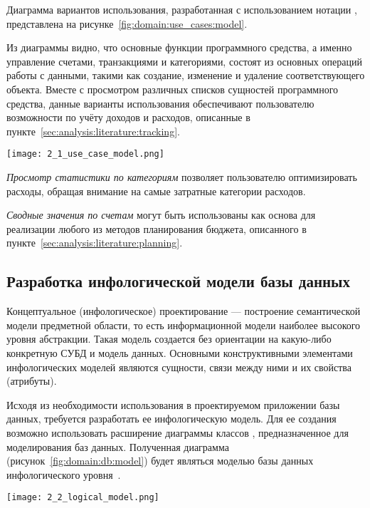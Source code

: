 Диаграмма вариантов использования, разработанная с использованием нотации \uml, представлена на рисунке~\ref{fig:domain:use_cases:model}.

Из диаграммы видно, что основные функции программного средства, а именно управление счетами, транзакциями и категориями, состоят из основных операций работы с данными, такими как создание, изменение и удаление соответствующего объекта.
Вместе с просмотром различных списков сущностей программного средства, данные варианты использования обеспечивают пользователю возможности по учёту доходов и расходов, описанные в пункте~\ref{sec:analysis:literature:tracking}.

\begin{sidewaysfigure}
    \centering
    \texttt{[image: 2\_1\_use\_case\_model.png]}
    \caption{Диаграмма вариантов использования ПС}
    \label{fig:domain:use_cases:model}
\end{sidewaysfigure}

\emph{Просмотр статистики по категориям} позволяет пользователю оптимизировать расходы, обращая внимание на самые затратные категории расходов.

\emph{Сводные значения по счетам} могут быть использованы как основа для реализации любого из методов планирования бюджета, описанного в пункте~\ref{sec:analysis:literature:planning}.

\subsection{Разработка инфологической модели базы данных}
\label{sec:domain:db}

Концептуальное (инфологическое) проектирование — построение семантической модели предметной области, то есть информационной модели наиболее высокого уровня абстракции.
Такая модель создается без ориентации на какую-либо конкретную СУБД и модель данных.
Основными конструктивными элементами инфологических моделей являются сущности, связи между ними и их свойства (атрибуты).

Исходя из необходимости использования в проектируемом приложении базы данных, требуется разработать ее инфологическую модель.
Для ее создания возможно использовать расширение диаграммы классов \uml, предназначенное для моделирования баз данных.
Полученная диаграмма (рисунок~\ref{fig:domain:db:model}) будет являться моделью базы данных инфологического уровня~\cite{kulikov_db_workbook}.

\begin{sidewaysfigure}
    \centering
    \texttt{[image: 2\_2\_logical\_model.png]}
    \caption{Инфологическая модель базы данных ПС}
    \label{fig:domain:db:model}
\end{sidewaysfigure}

